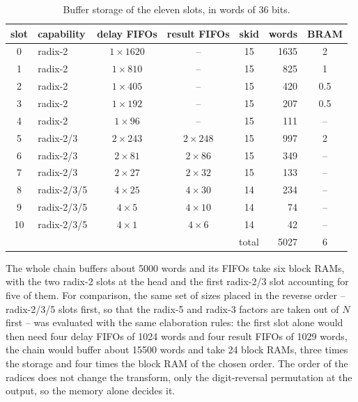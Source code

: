 \documentclass[a4paper,12pt, master]{etf}
\begin{document}
\begin{table}[H]
\centering
\caption{Buffer storage of the eleven slots, in words of 36 bits.}
\medskip
\label{tab:slot_memory}
\setlength{\tabcolsep}{4.5pt}
\begin{tabular}{c l c c c r c}
\hline
slot & capability & delay FIFOs & result FIFOs & skid & words & BRAM \\
\hline
\hline
0  & radix-2     & $1 \times 1620$ & --             & 15 & 1635 & 2   \\
1  & radix-2     & $1 \times 810$  & --             & 15 & 825  & 1   \\
2  & radix-2     & $1 \times 405$  & --             & 15 & 420  & 0.5 \\
3  & radix-2     & $1 \times 192$  & --             & 15 & 207  & 0.5 \\
4  & radix-2     & $1 \times 96$   & --             & 15 & 111  & --  \\
5  & radix-2/3   & $2 \times 243$  & $2 \times 248$ & 15 & 997  & 2   \\
6  & radix-2/3   & $2 \times 81$   & $2 \times 86$  & 15 & 349  & --  \\
7  & radix-2/3   & $2 \times 27$   & $2 \times 32$  & 15 & 133  & --  \\
8  & radix-2/3/5 & $4 \times 25$   & $4 \times 30$  & 14 & 234  & --  \\
9  & radix-2/3/5 & $4 \times 5$    & $4 \times 10$  & 14 & 74   & --  \\
10 & radix-2/3/5 & $4 \times 1$    & $4 \times 6$   & 14 & 42   & --  \\
\hline
\multicolumn{5}{r}{total} & 5027 & 6 \\
\hline
\end{tabular}
\end{table}

The whole chain buffers about 5000 words and its FIFOs take six block RAMs, with the two radix-2 slots at the head and the first radix-2/3 slot accounting for five of them. For comparison, the same set of sizes placed in the reverse order -- radix-2/3/5 slots first, so that the radix-5 and radix-3 factors are taken out of $N$ first -- was evaluated with the same elaboration rules: the first slot alone would then need four delay FIFOs of 1024 words and four result FIFOs of 1029 words, the chain would buffer about 15500 words and take 24 block RAMs, three times the storage and four times the block RAM of the chosen order. The order of the radices does not change the transform, only the digit-reversal permutation at the output, so the memory alone decides it.
\end{document}
